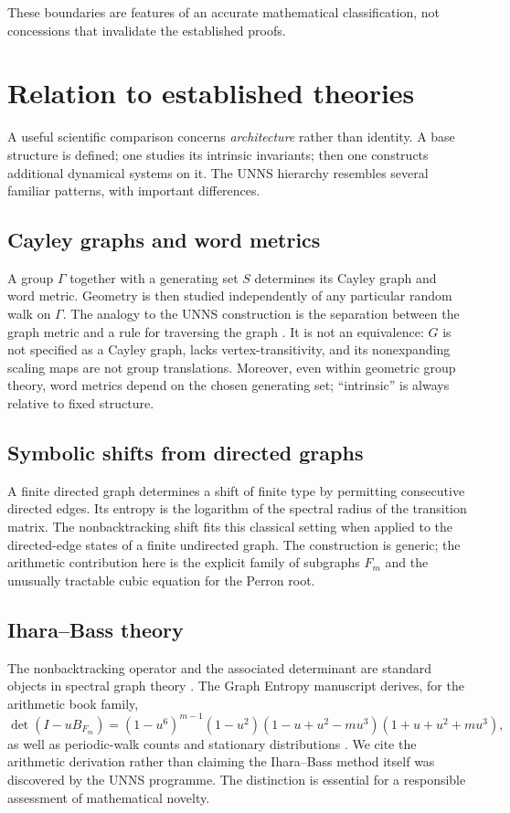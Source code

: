 \documentclass[11pt,a4paper]{article}
\theoremstyle{definition}\newtheorem{definition}[theorem]{Definition}
\begin{document}
These boundaries are features of an accurate mathematical classification, not concessions that invalidate the established proofs.

\section{Relation to established theories}
\label{sec:comparisons}
A useful scientific comparison concerns \emph{architecture} rather than identity. A base structure is defined; one studies its intrinsic invariants; then one constructs additional dynamical systems on it. The UNNS hierarchy resembles several familiar patterns, with important differences.

\subsection{Cayley graphs and word metrics}
A group $\Gamma$ together with a generating set $S$ determines its Cayley graph and word metric. Geometry is then studied independently of any particular random walk on $\Gamma$. The analogy to the UNNS construction is the separation between the graph metric and a rule for traversing the graph \cite{loeh}. It is not an equivalence: $G$ is not specified as a Cayley graph, lacks vertex-transitivity, and its nonexpanding scaling maps are not group translations. Moreover, even within geometric group theory, word metrics depend on the chosen generating set; ``intrinsic'' is always relative to fixed structure.

\subsection{Symbolic shifts from directed graphs}
A finite directed graph determines a shift of finite type by permitting consecutive directed edges. Its entropy is the logarithm of the spectral radius of the transition matrix. The nonbacktracking shift fits this classical setting when applied to the directed-edge states of a finite undirected graph. The construction is generic; the arithmetic contribution here is the explicit family of subgraphs $F_m$ and the unusually tractable cubic equation for the Perron root.

\subsection{Ihara--Bass theory}
The nonbacktracking operator and the associated determinant are standard objects in spectral graph theory \cite{kotani,ihara2026}. The Graph Entropy manuscript derives, for the arithmetic book family,
\begin{equation}\label{eq:det}
\det(I-uB_{F_m})=(1-u^6)^{m-1}(1-u^2)
(1-u+u^2-mu^3)(1+u+u^2+mu^3),
\end{equation}
as well as periodic-walk counts and stationary distributions \cite{entropy}. We cite the arithmetic derivation rather than claiming the Ihara--Bass method itself was discovered by the UNNS programme. The distinction is essential for a responsible assessment of mathematical novelty.
\end{document}
